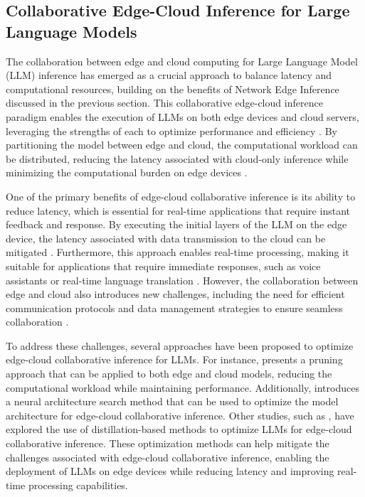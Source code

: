\documentclass[11pt,a4paper]{article}
\begin{document}
\subsection{Collaborative Edge-Cloud Inference for Large Language Models}


The collaboration between edge and cloud computing for Large Language Model (LLM) inference has emerged as a crucial approach to balance latency and computational resources, building on the benefits of Network Edge Inference discussed in the previous section. This collaborative edge-cloud inference paradigm enables the execution of LLMs on both edge devices and cloud servers, leveraging the strengths of each to optimize performance and efficiency \cite{doi:10.1109/twc.2022.3165824}. By partitioning the model between edge and cloud, the computational workload can be distributed, reducing the latency associated with cloud-only inference while minimizing the computational burden on edge devices \cite{doi:10.3390/electronics12173598}.

One of the primary benefits of edge-cloud collaborative inference is its ability to reduce latency, which is essential for real-time applications that require instant feedback and response. By executing the initial layers of the LLM on the edge device, the latency associated with data transmission to the cloud can be mitigated \cite{arxiv:2405.14371}. Furthermore, this approach enables real-time processing, making it suitable for applications that require immediate responses, such as voice assistants or real-time language translation \cite{arxiv:2309.14717}. However, the collaboration between edge and cloud also introduces new challenges, including the need for efficient communication protocols and data management strategies to ensure seamless collaboration \cite{arxiv:2405.12532}.

To address these challenges, several approaches have been proposed to optimize edge-cloud collaborative inference for LLMs. For instance, \cite{arxiv:2306.11695} presents a pruning approach that can be applied to both edge and cloud models, reducing the computational workload while maintaining performance. Additionally, \cite{arxiv:2405.18377} introduces a neural architecture search method that can be used to optimize the model architecture for edge-cloud collaborative inference. Other studies, such as \cite{arxiv:2411.19146}, have explored the use of distillation-based methods to optimize LLMs for edge-cloud collaborative inference. These optimization methods can help mitigate the challenges associated with edge-cloud collaborative inference, enabling the deployment of LLMs on edge devices while reducing latency and improving real-time processing capabilities.
\end{document}
